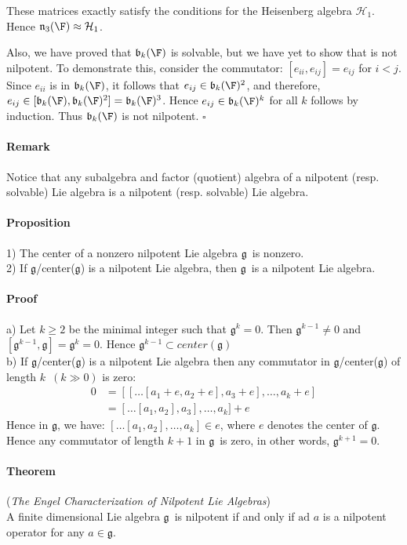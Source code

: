 \documentclass[11pt]{article}
\newcommand{\ad}{\mbox{ad\ }}
\newcommand{\g}{\ensuremath{\mathfrak{g}}}
\newcommand{\He}{\ensuremath{\mathcal{H}}}
\newcommand{\bk}{\ensuremath{\mathfrak{b}}}
\newcommand{\nk}{\ensuremath{\mathfrak{n}}}
\begin{document}
These matrices exactly satisfy the conditions for the Heisenberg algebra $\He_1$. Hence
$\nk_3(\F) \approx \He_1$.

Also, we have proved that $\bk_k(\F)$ is solvable, but we have yet to show that is not nilpotent.
To demonstrate this, consider the commutator: $[e_{ii},e_{ij}] = e_{ij}$ for $i < j$. Since
$e_{ii}$ is in $\bk_k(\F)$, it follows that $e_{ij} \in \bk_k(\F)^2$, and therefore, 
$e_{ij} \in [\bk_k(\F),\bk_k(\F)^2] = \bk_k(\F)^3$. Hence $e_{ij} \in \bk_k(\F)^k$ for all
$k$ follows by induction. Thus $\bk_k(\F)$ is not nilpotent. $\square$


\paragraph{Remark} Notice that any subalgebra and factor (quotient) 
algebra of a nilpotent (resp. solvable)
Lie algebra is a nilpotent (resp. solvable) Lie algebra.

\paragraph{Proposition}
1) The center of a nonzero nilpotent Lie algebra \g~is nonzero. \\
2) If \g/center(\g) is a nilpotent Lie algebra, then \g~is a nilpotent Lie algebra.


\paragraph{Proof}
a) Let $k \geq 2$ be the minimal integer such that $\g^k = 0$. Then
$\g^{k-1} \neq 0 $ and $[\g^{k-1},\g] = \g^k = 0$. Hence $\g^{k-1}
\subset center(\g)$ \\ b) If \g/center(\g) is a nilpotent Lie algebra
then any commutator in \g/center(\g) of length $k$~$(k \gg 0)$ is
zero: \\
\begin{align}
 0 &= [[ \dots [a_1+e,a_2+e],a_3+e], \dots ,a_k+e] \\
&=[\dots [a_1,a_2],a_3],\dots ,a_k] +e
\end{align}
Hence in \g, we have: $[\dots [a_1,a_2], \dots ,a_k] \in e$, where $e$ denotes 
the center of \g. Hence any commutator of length $k+1$ in \g~is zero, in other words,
$\g^{k+1} =0$.

\paragraph{Theorem} ({\it The Engel Characterization of Nilpotent Lie Algebras}) \\
A finite dimensional Lie algebra \g~is nilpotent if and only if $\ad{a}$ is a nilpotent
operator for any $a \in \g$.
\end{document}
